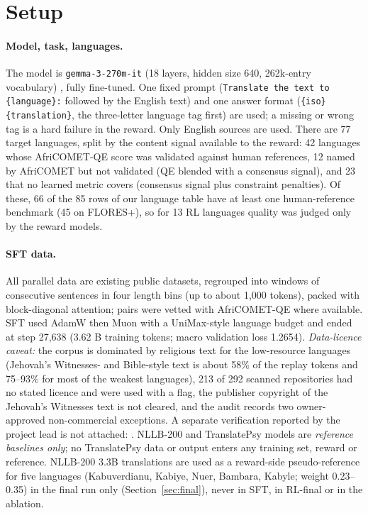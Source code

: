\section{Setup}\label{sec:setup}
\paragraph{Model, task, languages.} The model is \texttt{gemma-3-270m-it} (18 layers, hidden size 640, 262k-entry vocabulary) \citep{gemmateam2025gemma3,google2025gemma270m}, fully fine-tuned. One fixed prompt (\texttt{Translate the text to \{language\}:} followed by the English text) and one answer format (\texttt{\{iso\} \{translation\}}, the three-letter language tag first) are used; a missing or wrong tag is a hard failure in the reward. Only English sources are used. There are 77 target languages, split by the content signal available to the reward: 42 languages whose AfriCOMET-QE score was validated against human references, 12 named by AfriCOMET but not validated (QE blended with a consensus signal), and 23 that no learned metric covers (consensus signal plus constraint penalties). Of these, 66 of the 85 rows of our language table have at least one human-reference benchmark (45 on FLORES+), so for 13 RL languages quality was judged only by the reward models.

\paragraph{SFT data.} All parallel data are existing public datasets, regrouped into windows of consecutive sentences in four length bins (up to about 1,000 tokens), packed with block-diagonal attention; pairs were vetted with AfriCOMET-QE where available. SFT used AdamW then Muon with a UniMax-style language budget and ended at step 27,638 (3.62 B training tokens; macro validation loss 1.2654). \emph{Data-licence caveat:} the corpus is dominated by religious text for the low-resource languages (Jehovah's Witnesses- and Bible-style text is about 58\% of the replay tokens and 75--93\% for most of the weakest languages), 213 of 292 scanned repositories had no stated licence and were used with a flag, the publisher copyright of the Jehovah's Witnesses text is not cleared, and the audit records two owner-approved non-commercial exceptions. A separate verification reported by the project lead is not attached: . NLLB-200 and TranslatePsy models are \emph{reference baselines only}; no TranslatePsy data or output enters any training set, reward or reference. NLLB-200 3.3B translations are used as a reward-side pseudo-reference for five languages (Kabuverdianu, Kabiye, Nuer, Bambara, Kabyle; weight 0.23--0.35) in the final run only (Section~\ref{sec:final}), never in SFT, in RL-final or in the ablation.


